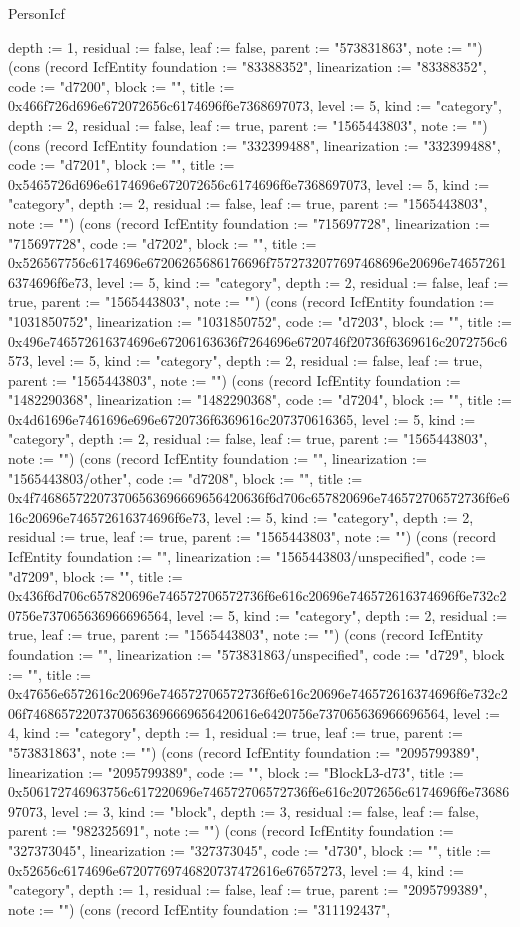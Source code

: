 \begin{lexlean}{PersonIcf}
\begin{semanticmodule}
{depth := 1, residual := false, leaf := false, parent := "573831863", note := ""}) (cons (record IcfEntity {foundation := "83388352", linearization := "83388352", code := "d7200", block := "", title := 0x466f726d696e672072656c6174696f6e7368697073, level := 5, kind := "category", depth := 2, residual := false, leaf := true, parent := "1565443803", note := ""}) (cons (record IcfEntity {foundation := "332399488", linearization := "332399488", code := "d7201", block := "", title := 0x5465726d696e6174696e672072656c6174696f6e7368697073, level := 5, kind := "category", depth := 2, residual := false, leaf := true, parent := "1565443803", note := ""}) (cons (record IcfEntity {foundation := "715697728", linearization := "715697728", code := "d7202", block := "", title := 0x526567756c6174696e67206265686176696f7572732077697468696e20696e746572616374696f6e73, level := 5, kind := "category", depth := 2, residual := false, leaf := true, parent := "1565443803", note := ""}) (cons (record IcfEntity {foundation := "1031850752", linearization := "1031850752", code := "d7203", block := "", title := 0x496e746572616374696e67206163636f7264696e6720746f20736f6369616c2072756c6573, level := 5, kind := "category", depth := 2, residual := false, leaf := true, parent := "1565443803", note := ""}) (cons (record IcfEntity {foundation := "1482290368", linearization := "1482290368", code := "d7204", block := "", title := 0x4d61696e7461696e696e6720736f6369616c207370616365, level := 5, kind := "category", depth := 2, residual := false, leaf := true, parent := "1565443803", note := ""}) (cons (record IcfEntity {foundation := "", linearization := "1565443803/other", code := "d7208", block := "", title := 0x4f746865722073706563696669656420636f6d706c657820696e746572706572736f6e616c20696e746572616374696f6e73, level := 5, kind := "category", depth := 2, residual := true, leaf := true, parent := "1565443803", note := ""}) (cons (record IcfEntity {foundation := "", linearization := "1565443803/unspecified", code := "d7209", block := "", title := 0x436f6d706c657820696e746572706572736f6e616c20696e746572616374696f6e732c20756e737065636966696564, level := 5, kind := "category", depth := 2, residual := true, leaf := true, parent := "1565443803", note := ""}) (cons (record IcfEntity {foundation := "", linearization := "573831863/unspecified", code := "d729", block := "", title := 0x47656e6572616c20696e746572706572736f6e616c20696e746572616374696f6e732c206f746865722073706563696669656420616e6420756e737065636966696564, level := 4, kind := "category", depth := 1, residual := true, leaf := true, parent := "573831863", note := ""}) (cons (record IcfEntity {foundation := "2095799389", linearization := "2095799389", code := "", block := "BlockL3-d73", title := 0x506172746963756c617220696e746572706572736f6e616c2072656c6174696f6e7368697073, level := 3, kind := "block", depth := 3, residual := false, leaf := false, parent := "982325691", note := ""}) (cons (record IcfEntity {foundation := "327373045", linearization := "327373045", code := "d730", block := "", title := 0x52656c6174696e67207769746820737472616e67657273, level := 4, kind := "category", depth := 1, residual := false, leaf := true, parent := "2095799389", note := ""}) (cons (record IcfEntity {foundation := "311192437", }
\end{semanticmodule}
\end{lexlean}
